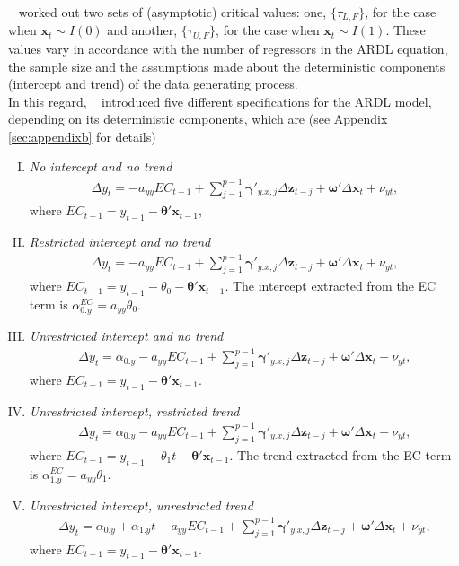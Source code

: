~\citet{pesaran2001} worked out two sets of (asymptotic) critical values: one, $\{\tau_{L,F}\}$, for the case when $\mathbf{x}_{t}\sim{I}(0)$ and another, $\{\tau_{U,F}\}$, for the case when $\mathbf{x}_{t}\sim{I}(1)$.  These values vary in accordance with the number of regressors in the ARDL equation, the sample size and the assumptions made about the deterministic components (intercept and trend) of the data generating process. \\ 
In this regard, ~\citet{pesaran2001} introduced five different specifications for the ARDL model, depending on its deterministic components, which are (see Appendix \ref{sec:appendixb} for details)
\begin{enumerate}[I.]
\item \textit{No intercept and no trend} 
\begin{align}\label{eq:case1}
\Delta y_t=-a_{yy}EC_{t-1}+\sum_{j=1}^{p-1}\boldsymbol{\gamma}'_{y.x,j}\Delta\mathbf{z}_{t-j}+\boldsymbol{\omega}'\Delta\mathbf{x}_{t}+\nu_{yt},
\end{align}  
where $EC_{t-1}=y_{t-1}-\boldsymbol{\theta}'\mathbf{x}_{t-1}$, \\
\item \textit{Restricted intercept and no trend} 
\begin{align}\label{eq:case2}
\Delta y_{t}=
-a_{yy}EC_{t-1}+\sum_{j=1}^{p-1}\boldsymbol{\gamma}'_{y.x,j}\Delta\mathbf{z}_{t-j}+\boldsymbol{\omega}'\Delta\mathbf{x}_{t}+\nu_{yt},
\end{align} 
where $EC_{t-1}=y_{t-1}-\theta_{0}-\boldsymbol{\theta}'\mathbf{x}_{t-1}$. The intercept extracted from the EC term is $\alpha_{0.y}^{EC} = a_{yy}\theta_0$.
\item \textit{Unrestricted intercept and no trend} 
\begin{align}\label{eq:case3}
\Delta y_{t}
=\alpha_{0.y}-a_{yy}EC_{t-1}+\sum_{j=1}^{p-1}\boldsymbol{\gamma}'_{y.x,j}\Delta\mathbf{z}_{t-j}+\boldsymbol{\omega}'\Delta\mathbf{x}_{t}+\nu_{yt},
\end{align}  
where $EC_{t-1}=y_{t-1}-\boldsymbol{\theta}'\mathbf{x}_{t-1}$.
\item \textit{Unrestricted intercept, restricted trend} 
\begin{align}\label{eq:case4}
\Delta y_{t}=
\alpha_{0.y}-a_{yy}EC_{t-1}+\sum_{j=1}^{p-1}\boldsymbol{\gamma}'_{y.x,j}\Delta\mathbf{z}_{t-j}+\boldsymbol{\omega}'\Delta\mathbf{x}_{t}+\nu_{yt},
\end{align}
where $EC_{t-1}=y_{t-1}-\theta_{1}t-\boldsymbol{\theta}'\mathbf{x}_{t-1}$. The trend extracted from the EC term is $\alpha_{1.y}^{EC} = a_{yy}\theta_1$.
\item \textit{Unrestricted intercept, unrestricted trend} 
\begin{align}\label{eq:case5}
\Delta y_{t}
=\alpha_{0.y}+\alpha_{1.y}t
-a_{yy}EC_{t-1}+\sum_{j=1}^{p-1}\boldsymbol{\gamma}'_{y.x,j}\Delta\mathbf{z}_{t-j}+\boldsymbol{\omega}'\Delta\mathbf{x}_{t}+\nu_{yt},
\end{align}
where $EC_{t-1}=y_{t-1}-\boldsymbol{\theta}'\mathbf{x}_{t-1}$.
\end{enumerate}

